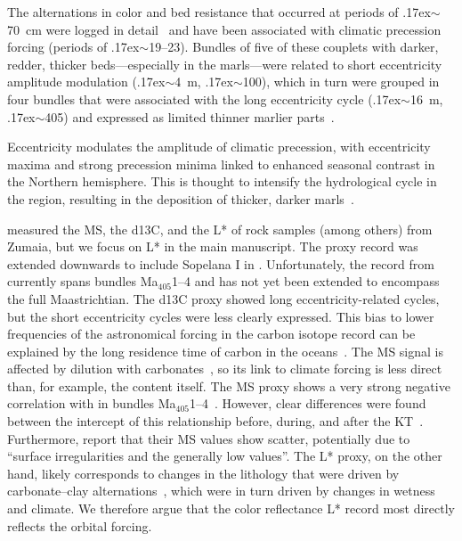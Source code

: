 \documentclass[draft]{agujournal2019}
\newcommand{\appr}{\raise.17ex\hbox{\(\scriptstyle\sim\)}} %
\newcommand{\ma}[1]{Ma\(_{405}\)#1} %
\begin{document}
The alternations in color and bed resistance that occurred at periods of \appr\qty{70}{\cm} were logged in detail~\cite{Batenburg2012,Dinares-Turell2013}
and have been associated with climatic precession forcing (periods of \appr\qtyrange{19}{23}{\kiloyear}).
Bundles of five of these couplets with darker, redder, thicker beds---especially in the marls---were related to short eccentricity amplitude modulation (\appr\qty{4}{\metre}, \appr\qty{100}{\kiloyear}),
which in turn were grouped in four bundles that were associated with the long eccentricity cycle (\appr\qty{16}{\metre}, \appr\qty{405}{\kiloyear}) and expressed as limited thinner marlier parts~\cite{Batenburg2012,Batenburg2014}.

Eccentricity modulates the amplitude of climatic precession, with eccentricity maxima and strong precession minima linked to enhanced seasonal contrast in the Northern hemisphere.
This is thought to intensify the hydrological cycle in the region, resulting in the deposition of thicker, darker marls~\cite{Batenburg2014}.

 measured the \gls{MS}, the \gls{d13C}, and the \acrfull{L*} of rock samples (among others) from Zumaia, but we focus on \gls{L*} in the main manuscript.
The  proxy record was extended downwards to include Sopelana I in .
Unfortunately, the  record from  currently spans bundles \ma{1--4} and has not yet been extended to encompass the full Maastrichtian.
The \gls{d13C} proxy showed long eccentricity-related cycles, but the short eccentricity cycles were less clearly expressed.
This bias to lower frequencies of the astronomical forcing in the carbon isotope record can be explained by the long residence time of carbon in the oceans~\cite{Zeebe2017,Kocken2019loscar}.
The \gls{MS} signal is affected by dilution with carbonates~\cite{tenKateSprenger1993},
so its link to climate forcing is less direct than, for example, the  content itself.
The \gls{MS} proxy shows a very strong negative correlation with  in bundles \ma{1--4}~\cite{tenKateSprenger1993,Gilabert2022}.
However, clear differences were found between the intercept of this relationship before, during, and after the \gls{KT}~\cite<supplementary figure S2 in>{Gilabert2022}.
Furthermore,  report that their \gls{MS} values show scatter, potentially due to ``surface irregularities and the generally low values''.
The \gls{L*} proxy, on the other hand, likely corresponds to changes in the lithology that were driven by carbonate--clay alternations~\cite{MountWard1986,Batenburg2012},
which were in turn driven by changes in wetness and climate.
We therefore argue that the color reflectance \gls{L*} record most directly reflects the orbital forcing.
\end{document}
